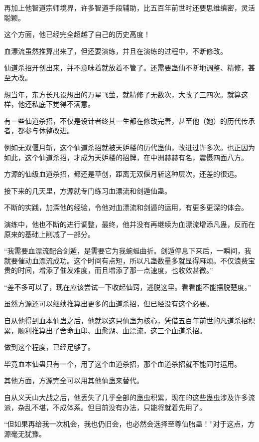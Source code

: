\begin{this_body}
再加上他智道宗师境界，许多智道手段辅助，比五百年前世时还要思维缜密，灵活聪颖。

这个方面，他已经完全超越了自己的历史高度！

血漂流虽然推算出来了，但还要演练，并且在演练的过程中，不断修改。

仙道杀招开创出来，并不意味着就放着不管了。还需要蛊仙不断地调整、精修，甚至大改。

想当年，东方长凡设想出的万星飞萤，就精修了无数次，大改了三四次。就算这样，他还私底下觉得不满意。

有一些仙道杀招，不仅是设计者终其一生都在修改完善，甚至他（她）的历代传承者，都参与休整改进。

例如无双偃月斩，这个仙道杀招就被天妒楼的历代蛊仙，改进过许多次。也正因为如此，这个仙道杀招，才成为天妒楼的招牌，在中洲赫赫有名，震慑四面八方。

方源的仙级血道杀招，都还是草创，距离无双偃月斩这种层次，还差的很远。

接下来的几天里，方源就专门练习血漂流和剑遁仙蛊。

不断的实践，加深他的经验，令他对血漂流和剑遁的运用，有更多更深的体会。

演练中，他也不断的进行调整，最终，他并没有再继续为血漂流增添凡蛊，反而在原来的基础上削减了一部分。

“我需要血漂流配合剑遁，是需要它为我蜿蜒曲折。剑遁停息下来后，一瞬间，我就要催动血漂流成功。这个时间有点短，所以凡蛊数量多就显得麻烦。不仅浪费宝贵的时间，增添了催发难度，而且增添了那一点速度，也收效甚微。”

“差不多可以了，现在应该尝试一下收起仙窍，逃脱这里。看看能不能摆脱楚度。”

虽然方源还可以继续推算出更多的血道杀招，但已经没有这个必要。

自从他得到血本仙蛊之后，他就以这只仙蛊为核心，凭借五百年前世的凡道杀招积累，顺利推算出了舍命血印、血愈湖、血漂流，这三个血道杀招。

做到这个程度，已经足够了。

毕竟血本仙蛊只有一个，用了这个血道杀招，那个血道杀招就不能同时运用。

其他方面，方源完全可以用其他仙蛊来替代。

自从义天山大战之后，他丢失了几乎全部的蛊虫积累，现在的这些蛊虫涉及许多流派，杂乱不堪，不成体系。但目前没有办法，只能将就着先用了。

“但如果再给我一次机会，我也仍旧会，也必然会选择至尊仙胎蛊！”对于这点，方源毫无犹豫。


\end{this_body}
